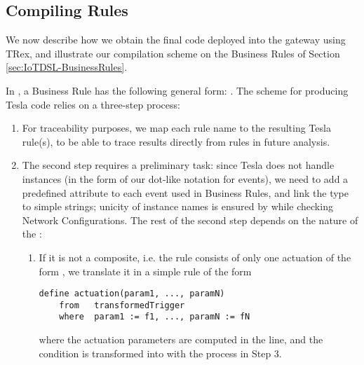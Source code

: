 \subsection{Compiling \IOTDSL Rules}
\label{sec:CG-Compilation}

We now describe how we obtain the final code deployed into the gateway using TRex, and illustrate our compilation scheme on the Business Rules of Section \ref{sec:IoTDSL-BusinessRules}.

In \IOTDSL, a Business Rule has the following general form: . The scheme for producing Tesla code relies on a three-step process:
\begin{enumerate}
	\item For traceability purposes, we map each rule name  to the resulting Tesla rule(s), to be able to trace results directly from \IOTDSL rules in future analysis.
	
	\item The second step requires a preliminary task: since Tesla does not handle instances (in the form of our dot-like notation for events), we need to add a predefined attribute  to each event  used in \IOTDSL Business Rules, and link the type  to simple strings; unicity of instance names is ensured by \IOTDSL while checking Network Configurations. The rest of the second step depends on the nature of the :
	\begin{enumerate}
		\item If it is not a composite, i.e. the rule consists of only one actuation of the form , we translate it in a simple rule of the form
		\begin{lstlisting}[language=tesla, numbers=none]
	define actuation(param1, ..., paramN)
	from   transformedTrigger
	where  param1 := f1, ..., paramN := fN
		\end{lstlisting}
		where the actuation parameters are computed in the  line, and the  condition is transformed into  with the process in Step 3.
		

\end{enumerate}
\end{enumerate}
